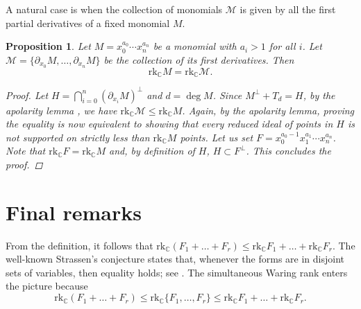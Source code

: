\documentclass{amsart}
\theoremstyle{plain}
\newtheorem{proposition}[theorem]{Proposition}
\theoremstyle{definition}
\theoremstyle{remark}
\newtheorem{remark}{Remark}[section]
\newcommand{\rk}{\mathrm{rk}}
\newcommand{\CC}{\mathbb{C}}
\newcommand{\caM}{\mathcal{M}}
\begin{document}
\indent A natural case is when the collection of monomials $\mathcal M$ is given by all the first partial derivatives of a fixed monomial $M$.

\begin{proposition}\label{LemmaDerivatives}
Let $M=x_0^{a_0}\cdots x_n^{a_n}$ be a monomial with $a_i>1$ for all $i$. Let  $\mathcal M = \{\partial_{x_0}M,\ldots,\partial_{x_n}M\}$ be the collection of its first derivatives. Then
 $$\rk_{\CC}M = \rk_{\CC}\caM.$$

\begin{proof}
Let $H=\bigcap_{i=0}^n (\partial_{x_i} M)^{\perp}$ and $d=\deg M$. Since $M^{\perp}+T_d = H$, by the apolarity lemma \cite[Lemma 1.15]{IK}, we have $\rk_{\CC}\caM \leq \rk_{\CC}M$. Again, by the apolarity lemma, proving the equality is now equivalent to showing that every reduced ideal of points in $H$ is not supported on strictly less than $\rk_{\CC} M$ points. Let us set $F=x_0^{a_0-1}x_1^{a_1}\cdots x_n^{a_n}$. Note that $\rk_{\CC} F=\rk_{\CC} M$ and, by definition of $H$, $H\subset F^{\perp}$. This concludes the proof.
\end{proof}

\end{proposition}





\section{Final remarks}

 From the definition, it follows that $\rk_{\CC} (F_1+\ldots+F_r)\leq \rk_{\CC} F_1+\ldots+\rk_{\CC} F_r$. The well-known Strassen's conjecture states that, whenever the forms are in disjoint sets of variables, then equality holds; see \cite{Strassen1973,CCO2017, T2015}. The simultaneous Waring rank enters the picture because
\[\rk_{\CC} (F_1+\ldots+F_r)\leq \rk_{\CC} \lbrace F_1,\ldots, F_r \rbrace \leq\rk_{\CC} F_1+\ldots+\rk_{\CC} F_r.\]
\end{document}
